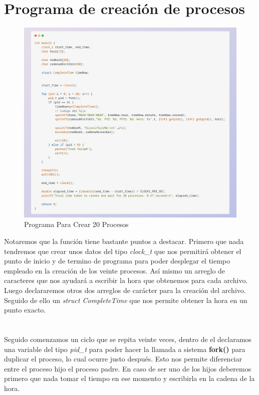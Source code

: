 \documentclass[10pt]{article}
\begin{document}
	\section{Programa de creación de procesos}
	\begin{figure}[h!]
		\centering
		\includegraphics[width=\linewidth]{pvh1.png}
		\caption{Programa Para Crear 20 Procesos}
		\label{fig:pvh1}
	\end{figure}
	Notaremos que la función tiene bastante puntos a destacar. Primero que nada tendremos que crear unos datos del tipo \textit{clock\_t} que nos permitirá obtener el punto de inicio y de termino de programa para poder desplegar el tiempo empleado en la creación de los veinte procesos. Así mismo un arreglo de caracteres que nos ayudará a escribir la hora que obtenemos para cada archivo. 
	Luego declararemos otros dos arreglos de carácter para la creación del archivo. Seguido de ello un \textit{struct CompleteTime} que nos permite obtener la hora en un punto exacto. 
	\\\\\\
	Seguido comenzamos un ciclo que se repita veinte veces, dentro de el declaramos una variable del tipo \textit{pid\_t} para poder hacer la llamada a sistema \textbf{fork()} para duplicar el proceso, lo cual ocurre justo después. Esto nos permite diferenciar entre el proceso hijo el proceso padre. En caso de ser uno de los hijos deberemos primero que nada tomar el tiempo en ese momento y escribirla en la cadena de la hora. 
\end{document}
